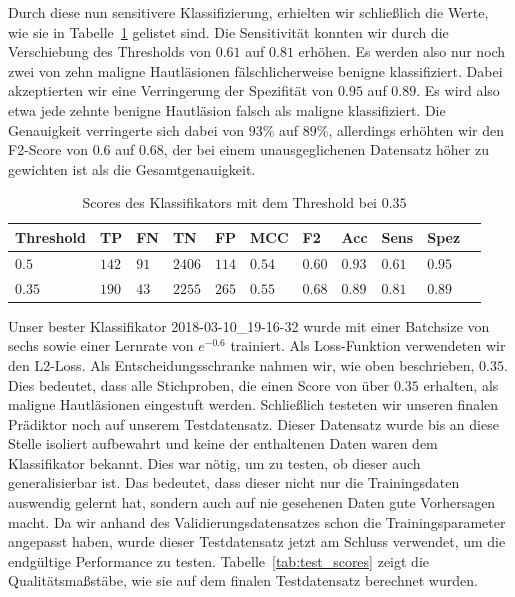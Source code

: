 Durch diese nun sensitivere Klassifizierung, erhielten wir schließlich die Werte, wie sie in Tabelle~\ref{tab:final_scores} gelistet sind. Die Sensitivität konnten wir durch die Verschiebung des Thresholds von $0.61$ auf $0.81$ erhöhen. Es werden also nur noch zwei von zehn maligne Hautläsionen fälschlicherweise benigne klassifiziert. Dabei akzeptierten wir eine Verringerung der Spezifität von $0.95$ auf $0.89$. Es wird also etwa jede zehnte benigne Hautläsion falsch als maligne klassifiziert. Die Genauigkeit verringerte sich dabei von $93\%$ auf $89\%$, allerdings erhöhten wir den F2-Score von $0.6$ auf $0.68$, der bei einem unausgeglichenen Datensatz höher zu gewichten ist als die Gesamtgenauigkeit.

\begin{table}[htb!]
\begin{center}
\begin{tabular}{lllllllllll}
	\toprule
 	Threshold  & TP & FN & TN & FP & MCC & F2 & Acc & Sens & Spez\\
	\midrule
    $0.5$ & $142$&	$91$ &	$2406$ &	$114$ &	$0.54$ 	&$0.60$	&$0.93$	&$0.61$&	$0.95$ \\
	$0.35$ & $190$ & $43$ &	$2255$ &	$265$ &	$0.55$ &	$0.68$&	$0.89$ &	$0.81$ & $0.89$\\
 \bottomrule
 \end{tabular}
 \end{center}
  \caption{Scores des Klassifikators mit dem Threshold bei $0.35$}
 \label{tab:final_scores}
 \end{table}

Unser bester Klassifikator 2018-03-10\_19-16-32 wurde mit einer Batchsize von sechs sowie einer Lernrate von $e^{-0.6}$ trainiert. Als Loss-Funktion verwendeten wir den L2-Loss. Als Entscheidungsschranke nahmen wir, wie oben beschrieben, $0.35$. Dies bedeutet, dass alle Stichproben, die einen Score von über $0.35$ erhalten, als maligne Hautläsionen eingestuft werden. Schließlich testeten wir unseren finalen Prädiktor noch auf unserem Testdatensatz. Dieser Datensatz wurde bis an diese Stelle isoliert aufbewahrt und keine der enthaltenen Daten waren dem Klassifikator bekannt. Dies war nötig, um zu testen, ob dieser auch generalisierbar ist. Das bedeutet, dass dieser nicht nur die Trainingsdaten auswendig gelernt hat, sondern auch auf nie gesehenen Daten gute Vorhersagen macht. Da wir anhand des Validierungsdatensatzes schon die Trainingsparameter angepasst haben, wurde dieser Testdatensatz jetzt am Schluss verwendet, um die endgültige Performance zu testen. Tabelle~\ref{tab:test_scores} zeigt die Qualitätsmaßstäbe, wie sie auf dem finalen Testdatensatz berechnet wurden.

